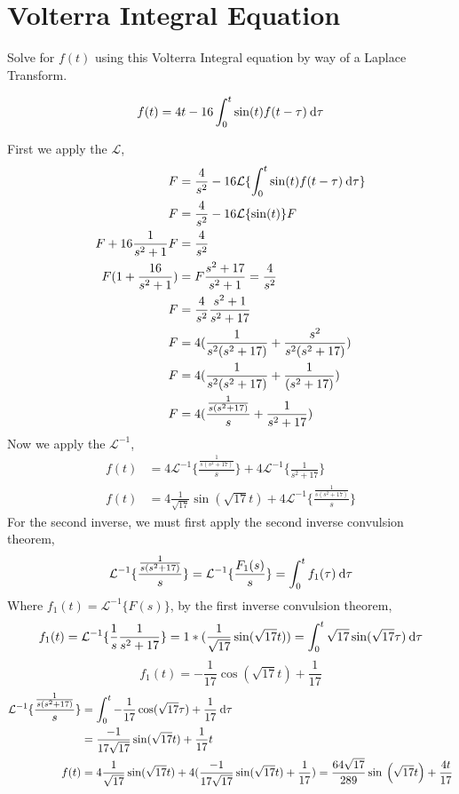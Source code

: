 \pagebreak
\section{Volterra Integral Equation}
Solve for $f(t)$ using this Volterra Integral equation by way of a Laplace Transform.

\begin{equation*}
f(t) = 4t-16\int_0^t \sin(t)f(t-\tau)\:\mathrm{d\tau}
\end{equation*}

First we apply the $\mathcal{L}$, 
\begin{align*}
	F &= \frac{4}{s^2} - 16\mathcal{L}\{\int_0^t \sin(t)f(t-\tau)\:\mathrm{d\tau}\} \\ 
	F &= \frac{4}{s^2} - 16\mathcal{L}\{\sin(t)\}F \\ 
	F + 16\frac{1}{s^2+1}F &= \frac{4}{s^2} \\ 
	F (1+\frac{16}{s^2+1}) &= F\frac{s^2+17}{s^2+1}=\frac{4}{s^2} \\ 
	F &= \frac{4}{s^2}\frac{s^2+1}{s^2+17} \\ 
	F &= 4(\frac{1}{s^2(s^2+17)}+\frac{s^2}{s^2(s^2+17)}) \\
	F &= 4(\frac{1}{s^2(s^2+17)}+\frac{1}{(s^2+17)}) \\
	F &= 4(\frac{\frac{1}{s(s^2+17)}}{s}+\frac{1}{s^2+17})
\end{align*}
Now we apply the $\mathcal{L}^{-1}$,
\begin{align*}
	f(t) &= 4\mathcal{L}^{-1}\{\frac{\frac{1}{s(s^2+17)}}{s}\} + 4\mathcal{L}^{-1}\{\frac{1}{s^2+17}\} \\
	f(t) &= 4\frac{1}{\sqrt{17}}\sin(\sqrt{17}t)+4\mathcal{L}^{-1}\{\frac{\frac{1}{s(s^2+17)}}{s}\}
\end{align*}
For the second inverse, we must first apply the second inverse convulsion theorem,
\begin{equation*}
\mathcal{L}^{-1}\{\frac{\frac{1}{s(s^2+17)}}{s}\} = \mathcal{L}^{-1}\{\frac{F_1(s)}{s}\} = \int_0^t f_1(\tau) \:\mathrm{d\tau} 
\end{equation*}
Where $f_1(t)=\mathcal{L}^{-1}\{F(s)\}$, by the first inverse convulsion theorem, 
\begin{equation*}
	f_1(t) =  \mathcal{L}^{-1} \{  \frac{1}{s}\frac{1}{s^2+17} \} = 
	 1 * (\frac{1}{\sqrt{17}}\sin(\sqrt{17}t)) = \int_0^t {\sqrt{17}}\sin(\sqrt{17}\tau) \:\mathrm{d\tau} 
\end{equation*}
\begin{equation*}
	f_1(t) = -\frac{1}{17}\cos(\sqrt{17}t)+\frac{1}{17}
\end{equation*}
\begin{align*}
	\mathcal{L}^{-1}\{\frac{\frac{1}{s(s^2+17)}}{s}\} &= \int_0^t -\frac{1}{17}\cos(\sqrt{17}\tau)+\frac{1}{17} \:\mathrm{d\tau} \\ 
	&= \frac{-1}{17\sqrt{17}}\sin(\sqrt{17}t)+\frac{1}{17}t \\ 
	f(t) &= 4\frac{1}{\sqrt{17}}\sin(\sqrt{17}t) + 4(\frac{-1}{17\sqrt{17}}\sin(\sqrt{17}t)+\frac{1}{17})= \frac{64\sqrt{17}}{289}\sin \:\left(\sqrt{17}t\right)+\frac{4t}{17}
\end{align*}


